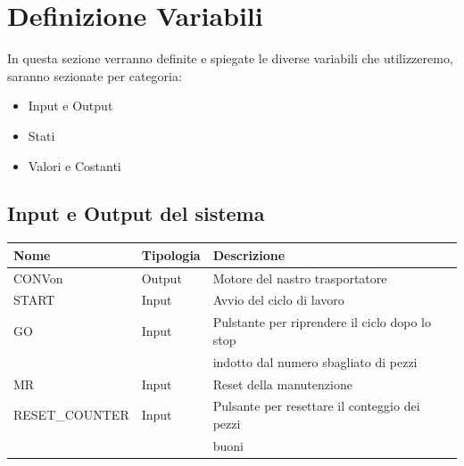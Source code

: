 \documentclass{article}
\begin{document}
\section{Definizione Variabili}
In questa sezione verranno definite e spiegate le diverse variabili che utilizzeremo, saranno sezionate per categoria:
\begin{itemize}
    \item Input e Output
    \item Stati
    \item Valori e Costanti
\end{itemize}

\subsection{Input e Output del sistema}
\begin{center}
    \begin{tabular}{l l l l }
        \toprule
        \textbf{Nome}  & \textbf{Tipologia} & \textbf{Descrizione}                           \\
        \midrule
        \midrule
        CONVon         & Output             & Motore del nastro trasportatore                \\
        \midrule

        START          & Input              & Avvio del ciclo di lavoro                      \\
        \midrule

        GO             & Input              & Pulstante per riprendere il ciclo dopo lo stop \\
                       &                    & indotto dal numero sbagliato di pezzi          \\
        \midrule
        MR             & Input              & Reset della manutenzione                       \\
        \midrule
        RESET\_COUNTER & Input              & Pulsante per resettare il conteggio dei pezzi  \\
                       &                    & buoni                                          \\
        \bottomrule
    \end{tabular}
\end{center}
\end{document}
